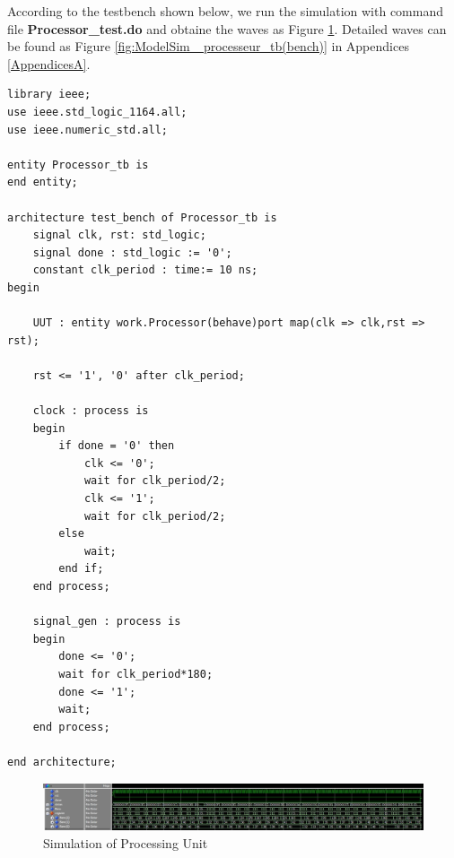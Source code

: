 According to the testbench shown below, we run the simulation with command file \textbf{Processor\_test.do} and obtaine the waves as Figure \ref{fig:PUres}.
Detailed waves can be found as Figure \ref{fig:ModelSim_ processeur_tb(bench)} in Appendices \ref{AppendicesA}.
\begin{lstlisting}[style=vhdl]
library ieee;
use ieee.std_logic_1164.all;
use ieee.numeric_std.all;
    
entity Processor_tb is
end entity;
    
architecture test_bench of Processor_tb is
    signal clk, rst: std_logic;
    signal done : std_logic := '0';
    constant clk_period : time:= 10 ns;
begin
    
    UUT : entity work.Processor(behave)port map(clk => clk,rst => rst);

    rst <= '1', '0' after clk_period;
    
    clock : process is 
    begin
        if done = '0' then
            clk <= '0';
            wait for clk_period/2;
            clk <= '1';
            wait for clk_period/2;
        else
            wait;
        end if;
    end process;
    
    signal_gen : process is
    begin
        done <= '0';
        wait for clk_period*180;
        done <= '1';
        wait;
    end process;
        
end architecture;
\end{lstlisting}

\begin{figure}[htp]
    \centering
    \includegraphics[width=1\textwidth]{picture/PUres.jpg}
    \caption{Simulation of Processing Unit}     
    \label{fig:PUres}
\end{figure}